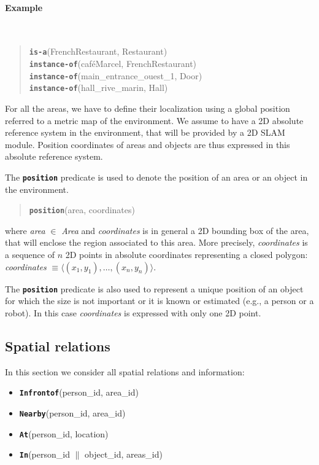 \documentclass{article}
\begin{document}
\paragraph*{\bf Example}~\\

\begin{quote}
{\tt\bf is-a}(FrenchRestaurant, Restaurant) \\
{\tt\bf instance-of}(caf\'eMarcel, FrenchRestaurant) \\
{\tt\bf instance-of}(main\_entrance\_ouest\_1, Door) \\
{\tt\bf instance-of}(hall\_rive\_marin, Hall) \\
\end{quote}


For all the areas, we have to define their localization using a global position referred to a metric map of the environment. We assume to have a 2D absolute reference system in the environment, that will be provided by a 2D SLAM module. Position coordinates of areas and objects are thus expressed in this absolute reference system.

The {\tt\bf position} predicate is used to denote the position of an area or an object in the environment.

\begin{quote}
{\tt\bf position}(area, coordinates)
\end{quote}

\noindent
where \emph{area} $\in$ \emph{Area} and \emph{coordinates} is in general a 2D bounding box of the area, that will enclose the region associated to this area. More precisely, \emph{coordinates} is a sequence of $n$ 2D points in absolute coordinates representing a closed polygon: \emph{coordinates} $\equiv \langle (x_1, y_1) , \ldots, (x_n, y_n) \rangle$.

The {\tt\bf position} predicate is also used to represent a unique position of an object for which the size is not important or it is known or estimated (e.g., a person or a robot). In this case \emph{coordinates} is expressed with only one 2D point. 




\subsection{Spatial relations}

In this section we consider all spatial relations and information:
\begin{itemize}
\item {\tt\bf Infrontof}(person\_id, area\_id)
\item {\tt\bf Nearby}(person\_id, area\_id)
\item {\tt\bf At}(person\_id, location)
\item {\tt\bf In}(person\_id $\|$ object\_id, areas\_id)
 \end{itemize}
\end{document}
